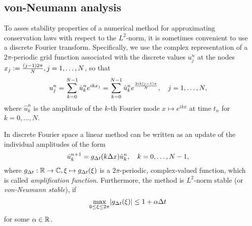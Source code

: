 \subsection{von-Neumann analysis}

To asses stability properties of a numerical method for approximating conservation laws with respect to the \(L^2\)-norm, it is sometimes convenient to use a discrete Fourier transform.
Specifically, we use the complex representation of a \(2\pi\)-periodic
 grid function associated with the discrete values \(u_j^n\) at the nodes \(x_j := \frac{\parentheses*{j - 1}2\pi}{N}, j = 1, \ldots, N\), so that
 \[
 	u_j^n = \sum_{k = 0}^{N - 1}\hat{u}_k^n e^{ikx_j} = \sum_{k = 0}^{N - 1}\hat{u}_k^n e^{\frac{2ik\parentheses*{j - 1}\pi}{N}}, \quad j = 1, \ldots, N,
 \]
 where \(\hat{u}_k^n\) is the amplitude of the \(k\)-th Fourier mode \(x \mapsto e^{ikx}\) at time \(t_n\) for \(k = 0, \ldots, N\).

\begin{theorem}
	In discrete Fourier space a linear method can be written as an update of the individual amplitudes of the form
	\[
		\hat{u}_k^{n + 1} = g_{\Delta t}\parentheses*{k\Delta x}\hat{u}_k^n, \quad k = 0, \ldots, N - 1,
	\]
	where \(g_{\Delta t}: \R \to \C, \xi \mapsto g_{\Delta t}\parentheses*{\xi}\) is a \(2\pi\)-periodic, complex-valued function, which is called \emph{amplification function}.
	Furthermore, the method is \(L^2\)-norm stable (or \emph{von-Neumann stable}), if
	\[
		\max_{0 \le \xi \le 2\pi}\absolute*{g_{\Delta t}\parentheses*{\xi}} \le 1 + \alpha\Delta t
	\]
	for some \(\alpha \in \R\).
\end{theorem}


